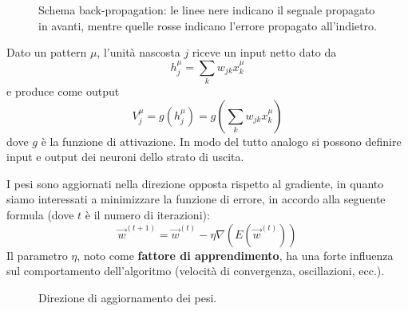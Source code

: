 \begin{figure}[h!]
	\caption[Schema back-propagation]{Schema back-propagation: le linee nere indicano il segnale propagato in avanti, mentre quelle rosse indicano l'errore propagato all'indietro.}
	\label{fig:backpro}
\end{figure}

\noindent Dato un pattern $\mu$, l'unità nascosta $j$ riceve un input netto dato da
\begin{displaymath}
	h_j^\mu = \sum_k w_{jk} x^\mu_k
\end{displaymath}
e produce come output
\begin{displaymath}
	V_j^\mu = g(h_j^\mu) = g\left(\sum_k w_{jk} x^\mu_k \right)
\end{displaymath}
dove $g$ è la funzione di attivazione. In modo del tutto analogo si possono definire input e output dei neuroni dello strato di uscita.

I pesi sono aggiornati nella direzione opposta rispetto al gradiente, in quanto siamo interessati a minimizzare la funzione di errore, in accordo alla seguente formula (dove $t$ è il numero di iterazioni):
\begin{displaymath}
	\vec{w}^{(t+1)} = \vec{w}^{(t)} - \eta \nabla (E(\vec{w}^{(t)}))
\end{displaymath}
Il parametro $\eta$, noto come \textbf{fattore di apprendimento}, ha una forte influenza sul comportamento dell'algoritmo (velocità di convergenza, oscillazioni, ecc.).
\begin{figure}[h!]
	\centering
	\caption{Direzione di aggiornamento dei pesi.}
\end{figure}

